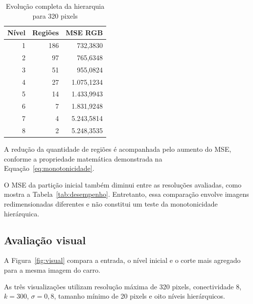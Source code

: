 \documentclass[12pt]{article}
\begin{document}
\begin{table}[htbp]
\centering
\caption{Evolução completa da hierarquia para 320 pixels}
\label{tab:hierarquia}
\begin{tabular}{rrr}
\toprule
Nível & Regiões & MSE RGB \\
\midrule
1 & 186 & 732,3830 \\
2 & 97 & 765,6348 \\
3 & 51 & 955,0824 \\
4 & 27 & 1.075,1234 \\
5 & 14 & 1.433,9943 \\
6 & 7 & 1.831,9248 \\
7 & 4 & 5.243,5814 \\
8 & 2 & 5.248,3535 \\
\bottomrule
\end{tabular}
\end{table}

A redução da quantidade de regiões
é acompanhada pelo aumento do MSE,
conforme a propriedade matemática
demonstrada na Equação~\ref{eq:monotonicidade}.

O MSE da partição inicial também
diminui entre as resoluções avaliadas,
como mostra a Tabela~\ref{tab:desempenho}.
Entretanto, essa comparação envolve
imagens redimensionadas diferentes e
não constitui um teste da monotonicidade
hierárquica.

\subsection{Avaliação visual}

A Figura~\ref{fig:visual} compara a entrada, o nível inicial
e o corte mais agregado para a mesma imagem do carro.

As três visualizações utilizam resolução máxima de 320 pixels,
conectividade 8, $k=300$, $\sigma=0{,}8$, tamanho mínimo de
20 pixels e oito níveis hierárquicos.
\end{document}
